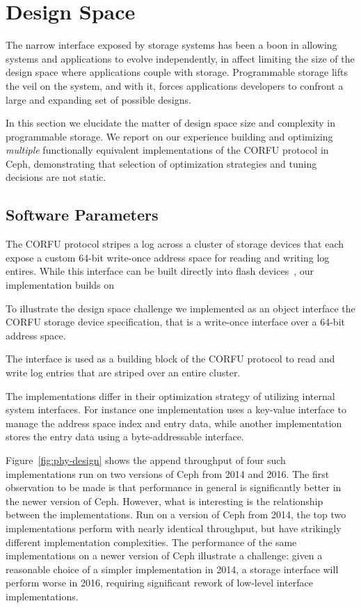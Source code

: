\section{Design Space}
\label{sec:dspace}

The narrow interface exposed by storage systems has been a boon in allowing
systems and applications to evolve independently, in affect limiting the size
of the design space where applications couple with storage. Programmable
storage lifts the veil on the system, and with it, forces applications developers
to confront a large and expanding set of possible designs.

In this section we elucidate the matter of design space size and complexity in
programmable storage. We report on our experience building and optimizing
\emph{multiple} functionally equivalent implementations of the CORFU protocol
in Ceph, demonstrating that selection of optimization strategies and tuning
decisions are not static.

\subsection{Software Parameters}

The CORFU protocol stripes a log across a cluster of storage devices that each
expose a custom 64-bit write-once address space for reading and writing log
entires. While this interface can be built directly into flash
devices~\cite{wei:systor13}, our implementation builds on 


To illustrate the design space challenge we implemented as an object interface
the CORFU storage device specification, that is a write-once interface over a
64-bit address space.

The interface is used as a building block of the CORFU
protocol to read and write log entries that are striped over an entire
cluster.

 The implementations differ in their optimization strategy of
utilizing internal system interfaces. For instance one implementation uses a
key-value interface to manage the address space index and entry data, while
another implementation stores the entry data using a byte-addressable
interface. 

Figure~\ref{fig:phy-design} shows the append throughput of four such
implementations run on two versions of Ceph from 2014 and 2016. The first
observation to be made is that performance in general is significantly better
in the newer version of Ceph. However, what is interesting is the relationship
between the implementations. Run on a version of Ceph from 2014, the top two
implementations perform with nearly identical throughput, but have strikingly
different implementation complexities. The performance of the same
implementations on a newer version of Ceph illustrate a challenge: given a
reasonable choice of a simpler implementation in 2014, a storage interface
will perform worse in 2016, requiring significant rework of low-level
interface implementations.

